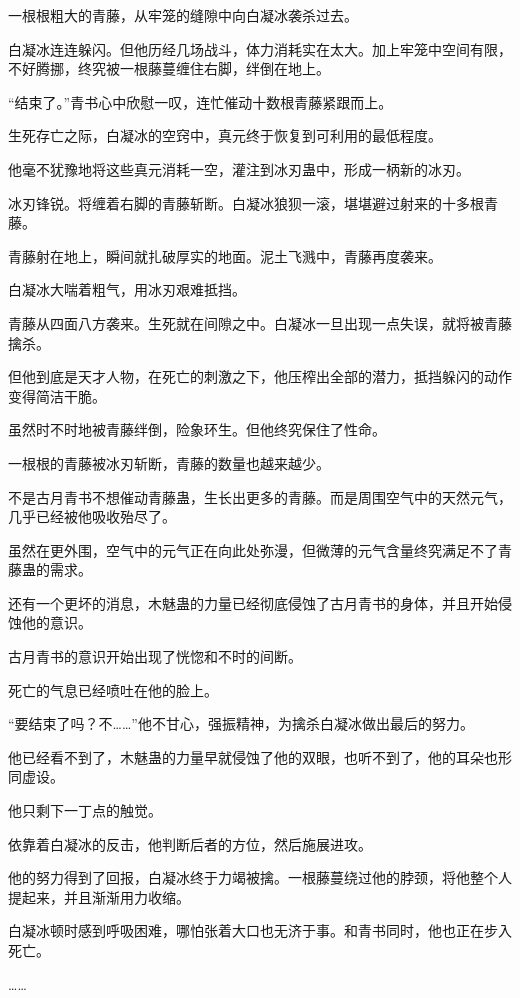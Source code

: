 \begin{this_body}
一根根粗大的青藤，从牢笼的缝隙中向白凝冰袭杀过去。

白凝冰连连躲闪。但他历经几场战斗，体力消耗实在太大。加上牢笼中空间有限，不好腾挪，终究被一根藤蔓缠住右脚，绊倒在地上。

“结束了。”青书心中欣慰一叹，连忙催动十数根青藤紧跟而上。

生死存亡之际，白凝冰的空窍中，真元终于恢复到可利用的最低程度。

他毫不犹豫地将这些真元消耗一空，灌注到冰刃蛊中，形成一柄新的冰刃。

冰刃锋锐。将缠着右脚的青藤斩断。白凝冰狼狈一滚，堪堪避过射来的十多根青藤。

青藤射在地上，瞬间就扎破厚实的地面。泥土飞溅中，青藤再度袭来。

白凝冰大喘着粗气，用冰刃艰难抵挡。

青藤从四面八方袭来。生死就在间隙之中。白凝冰一旦出现一点失误，就将被青藤擒杀。

但他到底是天才人物，在死亡的刺激之下，他压榨出全部的潜力，抵挡躲闪的动作变得简洁干脆。

虽然时不时地被青藤绊倒，险象环生。但他终究保住了性命。

一根根的青藤被冰刃斩断，青藤的数量也越来越少。

不是古月青书不想催动青藤蛊，生长出更多的青藤。而是周围空气中的天然元气，几乎已经被他吸收殆尽了。

虽然在更外围，空气中的元气正在向此处弥漫，但微薄的元气含量终究满足不了青藤蛊的需求。

还有一个更坏的消息，木魅蛊的力量已经彻底侵蚀了古月青书的身体，并且开始侵蚀他的意识。

古月青书的意识开始出现了恍惚和不时的间断。

死亡的气息已经喷吐在他的脸上。

“要结束了吗？不……”他不甘心，强振精神，为擒杀白凝冰做出最后的努力。

他已经看不到了，木魅蛊的力量早就侵蚀了他的双眼，也听不到了，他的耳朵也形同虚设。

他只剩下一丁点的触觉。

依靠着白凝冰的反击，他判断后者的方位，然后施展进攻。

他的努力得到了回报，白凝冰终于力竭被擒。一根藤蔓绕过他的脖颈，将他整个人提起来，并且渐渐用力收缩。

白凝冰顿时感到呼吸困难，哪怕张着大口也无济于事。和青书同时，他也正在步入死亡。

……


\end{this_body}

